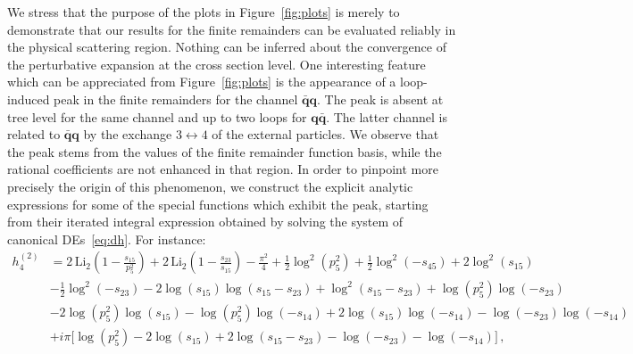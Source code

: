 \documentclass[main.tex]{subfiles}
\begin{document}
We stress that the purpose of the plots in Figure~\ref{fig:plots} is merely to demonstrate that our results for the finite remainders can be evaluated reliably in the physical scattering region. Nothing can be inferred about the convergence of the perturbative expansion at the cross section level. One interesting feature which can be appreciated from Figure~\ref{fig:plots} is the appearance of a loop-induced peak in the finite remainders for the channel $\mathbf{\bar{q}q}$. The peak is absent at tree level for the same channel and up to two loops for $\mathbf{q\bar{q}}$. The latter channel is related to $\mathbf{\bar{q}q}$ by the exchange $3\leftrightarrow 4$ of the external particles. We observe that the peak stems from the values of the finite remainder function basis, while the rational coefficients are not enhanced in that region. In order to pinpoint more precisely the origin of this phenomenon, we construct the explicit analytic expressions for some of the special functions which exhibit the peak, starting from their iterated integral expression obtained by solving the system of canonical DEs~\ref{eq:dh}. For instance:
\begin{equation} \label{eq:h24}
\begin{aligned}
h^{(2)}_4 & = 2 \, \text{Li}_2\left( 1 - \frac{s_{15}}{p_5^2} \right) + 2 \, \text{Li}_2 \left( 1- \frac{s_{23}}{s_{15}}\right) -\frac{\pi^2}{4} + \frac{1}{2} \log^2\left( p_5^2 \right) + \frac{1}{2}\log^2\left( -s_{45}\right) + 2 \log^2\left( s_{15}\right) \\
& - \frac{1}{2}\log^2\left( -s_{23}\right) - 2 \log\left( s_{15}\right) \log\left( s_{15} - s_{23}\right) + \log^2\left( s_{15} - s_{23}\right) + \log\left( p_5^2\right) \log\left(-s_{23}\right)  \\
& - 2 \log\left( p_5^2\right) \log\left(s_{15} \right)  - \log\left( p_5^2\right) \log\left( -s_{14}\right) +2 \log\left( s_{15}\right) \log\left( -s_{14}\right) 
 - \log\left(-s_{23}\right) \log\left( -s_{14}\right) \\
 & +i \pi \biggl[ \log\left( p_5^2\right) - 2 \log\left( s_{15}\right) + 2 \log\left( s_{15} - s_{23}\right) - \log\left( -s_{23}\right) - \log\left( -s_{14}\right)\biggr] \,,
\end{aligned}
\end{equation}
\end{document}
